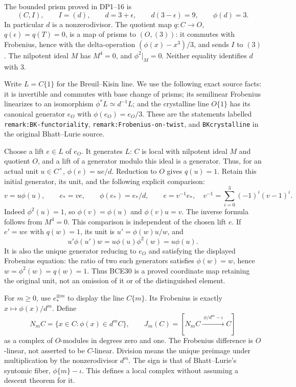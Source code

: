 The bounded prism proved in DP1--16 is
\begin{equation}\tag{BCE29}
(C,I),\qquad I=(d),\qquad d=3+\epsilon,\qquad
d(3-\epsilon)=9,\qquad \phi(d)=3 .
\end{equation}
In particular \(d\) is a nonzerodivisor. The quotient map
\(q:C\to O\), \(q(\epsilon)=q(T)=0\), is a map of prisms to
\((O,(3))\): it commutes with Frobenius, hence with the
delta-operation \((\phi(x)-x^3)/3\), and sends \(I\) to \((3)\).
The nilpotent ideal \(M\) has \(M^4=0\), and
\(\phi^2|_M=0\). Neither equality identifies \(d\) with \(3\).

Write \(L=C\{1\}\) for the Breuil--Kisin line. We use the
following exact source facts: it is invertible and commutes
with base change of prisms; its semilinear Frobenius linearizes
to an isomorphism \(\phi^*L\simeq d^{-1}L\); and the crystalline
line \(O\{1\}\) has its canonical generator \(e_O\) with
\(\phi(e_O)=e_O/3\). These are the statements labelled
\texttt{remark:BK-functoriality},
\texttt{remark:Frobenius-on-twist}, and
\texttt{BKcrystalline} in the original Bhatt--Lurie source.

Choose a lift \(e\in L\) of \(e_O\). It generates \(L\):
\(C\) is local with nilpotent ideal \(M\) and quotient \(O\),
and a lift of a generator modulo this ideal is a generator.
Thus, for an actual unit \(u\in C^\times\),
\(\phi(e)=u e/d\). Reduction to \(O\) gives \(q(u)=1\).
Retain this initial generator, its unit, and the following
explicit comparison:
\begin{equation}\tag{BCE30}
v=u\phi(u),\qquad e_*=v e,\qquad
\phi(e_*)=e_*/d,\qquad
e=v^{-1}e_*,
\quad v^{-1}=\sum_{i=0}^{3}(-1)^i(v-1)^i .
\end{equation}
Indeed \(\phi^2(u)=1\), so \(\phi(v)=\phi(u)\) and
\(\phi(v)u=v\). The inverse formula follows from \(M^4=0\).
This comparison is independent of the chosen lift \(e\).
If \(e'=w e\) with \(q(w)=1\), its unit is
\(u'=\phi(w)u/w\), and
\[
u'\phi(u')w=u\phi(u)\phi^2(w)=u\phi(u).
\]
It is also the unique generator reducing to \(e_O\) and
satisfying the displayed Frobenius equation: the ratio of
two such generators satisfies \(\phi(w)=w\), hence
\(w=\phi^2(w)=q(w)=1\).
Thus BCE30 is a proved coordinate map retaining the original
unit, not an omission of it or of the distinguished element.

For \(m\ge0\), use \(e_*^{\otimes m}\) to display the line
\(C\{m\}\). Its Frobenius is exactly \(x\mapsto\phi(x)/d^m\).
Define
\begin{equation}\tag{BCE31}
N_mC=\{x\in C:\phi(x)\in d^mC\},\qquad
J_m(C)=[N_mC\xrightarrow{\ \phi/d^m-\iota\ } C]
\end{equation}
as a complex of \(O\)-modules in degrees zero and one.
The Frobenius difference is \(O\)-linear, not asserted
to be \(C\)-linear. Division means the unique preimage
under multiplication by the nonzerodivisor \(d^m\).
The sign is that of Bhatt--Lurie's syntomic fiber,
\(\phi\{m\}-\iota\). This defines a local complex without
assuming a descent theorem for it.

